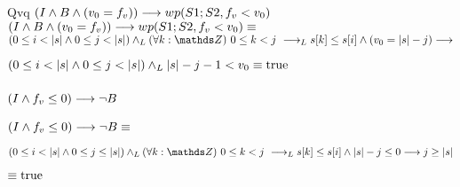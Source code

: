 \documentclass{article}
\begin{document}
Qvq $(I \wedge B \wedge (v_{0} = f_{v})) \longrightarrow wp(S1;S2, f_{v} < v_{0})$ \\

$(I \wedge B \wedge (v_{0} = f_{v})) \longrightarrow wp(S1;S2, f_{v} < v_{0}) \equiv$ \\

$(0 \leq i < \longitud{s} \wedge 0 \leq j < \longitud{s}) \yLuego \paraTodo{k}{0}{j} \implicaLuego s[k] \leq s[i] \wedge (v_{0} = \longitud{s}-j)\implica$

$(0 \leq i < |s| \wedge 0 \leq j < |s|) \land _L |s|-j-1<v_{0} \equiv \mathrm{true}$

\subsubsection*{$(I \wedge f_{v} \leq 0) \longrightarrow \neg B$}

$(I \wedge f_{v} \leq 0) \longrightarrow \neg B \equiv $

$(0 \leq i < \longitud{s} \wedge 0 \leq j \leq \longitud{s}) \yLuego \paraTodo{k}{0}{j} \implicaLuego s[k] \leq s[i] \wedge \longitud{s}-j \leq 0 \implica j \geq \longitud{s} $

$\equiv \mathrm{true}$
\end{document}
